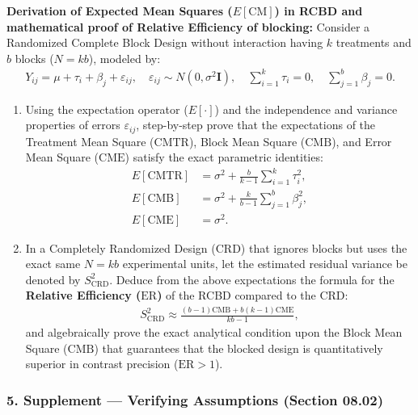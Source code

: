 \begin{problema}
	\label{prob:anova_desaf_esperanzas_dbca}
	\textbf{Derivation of Expected Mean Squares ($E[\text{CM}]$) in RCBD and mathematical proof of Relative Efficiency of blocking:}
	Consider a Randomized Complete Block Design without interaction having $k$ treatments and $b$ blocks ($N = kb$), modeled by:
	\begin{align}
		Y_{ij} = \mu + \tau_i + \beta_j + \varepsilon_{ij}, \quad \varepsilon_{ij} \sim N(0, \sigma^2 \mathbf{I}), \quad \sum_{i=1}^k \tau_i = 0, \quad \sum_{j=1}^b \beta_j = 0.
	\end{align}
	\begin{enumerate}
		\item Using the expectation operator ($E[\cdot]$) and the independence and variance properties of errors $\varepsilon_{ij}$, step-by-step prove that the expectations of the Treatment Mean Square ($\text{CMTR}$), Block Mean Square ($\text{CMB}$), and Error Mean Square ($\text{CME}$) satisfy the exact parametric identities:
		\begin{align}
			E[\text{CMTR}] &= \sigma^2 + \frac{b}{k-1}\sum_{i=1}^k \tau_i^2, \\
			E[\text{CMB}] &= \sigma^2 + \frac{k}{b-1}\sum_{j=1}^b \beta_j^2, \\
			E[\text{CME}] &= \sigma^2.
		\end{align}
		\item In a Completely Randomized Design (CRD) that ignores blocks but uses the exact same $N = kb$ experimental units, let the estimated residual variance be denoted by $S_{\text{CRD}}^2$. Deduce from the above expectations the formula for the \textbf{Relative Efficiency ($\text{ER}$)} of the RCBD compared to the CRD:
		\begin{align}
			S_{\text{CRD}}^2 \approx \frac{(b-1)\text{CMB} + b(k-1)\text{CME}}{kb - 1},
		\end{align}
		and algebraically prove the exact analytical condition upon the Block Mean Square ($\text{CMB}$) that guarantees that the blocked design is quantitatively superior in contrast precision ($\text{ER} > 1$).
	\end{enumerate}
\end{problema}


\subsubsection*{5. Supplement --- Verifying Assumptions (Section 08.02)}

